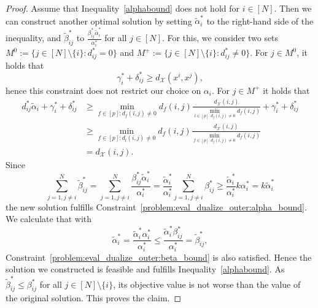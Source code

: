 \documentclass[11pt, a4paper]{article}
\newcommand{\X}{{\mathcal{X}}} %
\newcommand{\solution}{x}
\newcommand{\instanceindex}{i}
\newcommand{\instanceindextwo}{j}
\newcommand{\instfeatures}{[p]} %
\newcommand{\soldist}[1][(\instanceindex,\instanceindextwo)]{d_\X#1} %
\begin{document}
\begin{proof}
	Assume that Inequality~\eqref{alphabound} does not hold for  $i \in [N]$. Then we can construct another optimal solution by
        setting $\tilde{\alpha}_i^*$ to the right-hand side of the inequality, and $\tilde{\beta}^*_{ij}$ to $\frac{\beta^*_{ij}\tilde{\alpha}_i^*}{\alpha_i^*}$ for all $j\in [N]$. For this, we consider two sets $M^0 := \{j \in [N]\setminus \{i\} \colon d^*_{ij} = 0\}$ and $M^+:= \{j \in [N]\setminus \{i\} \colon d^*_{ij} \neq 0\}$. For $j \in M^0$, it holds that
	\begin{equation*}
		\gamma_i^* + \delta^*_{ij} \geq d_\X(\solution^i,\solution^j),
	\end{equation*}
	hence this constraint does not restrict our choice on $\alpha_i$. For $j \in M^+$ it holds that
	\begin{align*}
		d_{ij}^* \tilde{\alpha}_i + \gamma_i^* + \delta_{ij}^*& \geq \min_{f\in \instfeatures: d_f(i,j) \neq 0}d_f(i,j) \frac{\soldist}{\min_{l\in \instfeatures: d_f(i,j) \neq 0} d_f(i,j)} + \gamma_i^* + \delta_{ij}^*\\ 
		&\geq \min_{f\in \instfeatures: d_l(i,j) \neq 0}d_f(i,j) \frac{\soldist}{\min_{f\in \instfeatures: d_f(i,j) \neq 0} d_f(i,j)}\\ 
		&= \soldist. %
	\end{align*}
Since
	\begin{equation*}
		\sum_{j =1,j\neq i}^N \tilde{\beta}_{ij}^* = \sum_{j =1,j\neq i}^N \frac{\beta_{ij}^* \tilde{\alpha}^*_i}{\alpha_i^*} = \frac{\tilde{\alpha}^*_i}{\alpha_i^*} \sum_{j =1,j\neq i}^N \beta_{ij}^* \geq \frac{\tilde{\alpha}^*_i}{\alpha_i^*} k \alpha_i^* = k \tilde{\alpha}_i^*
	\end{equation*}
the new solution fulfills Constraint~\eqref{problem:eval_dualize_outer:alpha_bound}.
We calculate that with
	\begin{equation*}
		\tilde{\alpha}_i^* = \frac{\tilde{\alpha}_i^* \alpha_i^*}{\alpha_i^*} \leq \frac{\tilde{\alpha}_i^* \beta_{ij}^*}{\alpha_i^*} = \tilde{\beta}_{ij}^*,
	\end{equation*}
Constraint~\eqref{problem:eval_dualize_outer:beta_bound} is also satisfied. Hence the solution we constructed is feasible and fulfills Inequality~\eqref{alphabound}. As $\tilde{\beta}_{ij}^* \leq \beta_{ij}^*$ for all $j \in [N]\setminus \{i\}$, its objective value is not worse than the value of the original solution. This proves the claim. %
\end{proof}
\end{document}
